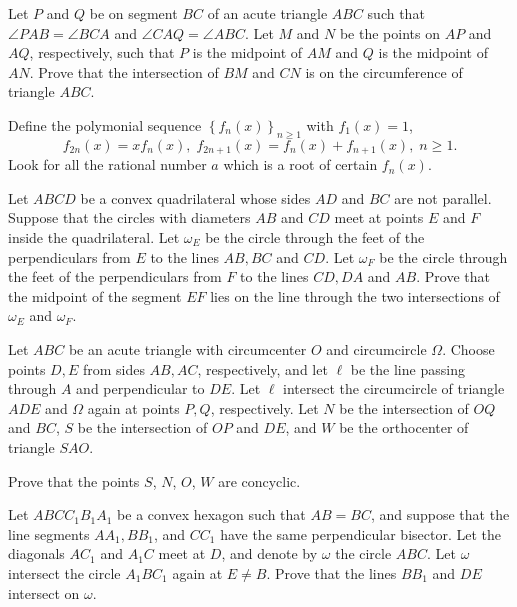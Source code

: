 \documentclass[11pt]{scrartcl}
\begin{document}
\begin{problem}[5026826170538858627]
Let $P$ and $Q$ be on segment $BC$ of an acute triangle $ABC$ such that $\angle PAB=\angle BCA$ and $\angle CAQ=\angle ABC$. Let $M$ and $N$ be the points on $AP$ and $AQ$, respectively, such that $P$ is the midpoint of $AM$ and $Q$ is the midpoint of $AN$. Prove that the intersection of $BM$ and $CN$ is on the circumference of triangle $ABC$.
\end{problem}
\begin{problem}[5041525965152542097]
Define the polymonial sequence $\left \{ f_n\left ( x \right ) \right \}_{n\ge 1}$ with $f_1\left ( x \right )=1$,$$f_{2n}\left ( x \right )=xf_n\left ( x \right ), \; f_{2n+1}\left ( x \right ) = f_n\left ( x \right )+ f_{n+1} \left ( x \right ), \; n\ge 1.$$Look for all the rational number $a$ which is a root of certain $f_n\left ( x \right ).$
\end{problem}
\begin{problem}[5062971667185317512]
	Let $ABCD$ be a convex quadrilateral whose sides $AD$ and $BC$ are not parallel. Suppose that the circles with diameters $AB$ and $CD$ meet at points $E$ and $F$ inside the quadrilateral. Let $\omega_E$ be the circle through the feet of the perpendiculars from $E$ to the lines $AB,BC$ and $CD$. Let $\omega_F$ be the circle through the feet of the perpendiculars from $F$ to the lines $CD,DA$ and $AB$. Prove that the midpoint of the segment $EF$ lies on the line through the two intersections of $\omega_E$ and $\omega_F$.
\end{problem}
\begin{problem}[5066939379306191291]
Let $ABC$ be an acute triangle with circumcenter $O$ and circumcircle $\Omega$. Choose points $D, E$ from sides $AB, AC$, respectively, and let $\ell$ be the line passing through $A$ and perpendicular to $DE$. Let $\ell$ intersect the circumcircle of triangle $ADE$ and $\Omega$ again at points $P, Q$, respectively. Let $N$ be the intersection of $OQ$ and $BC$, $S$ be the intersection of $OP$ and $DE$, and $W$ be the orthocenter of triangle $SAO$.

Prove that the points $S$, $N$, $O$, $W$ are concyclic.
\end{problem}
\begin{problem}[5073004669687570949]
	Let $ABCC_1B_1A_1$ be a convex hexagon such that $AB=BC$, and suppose that the line segments $AA_1, BB_1$, and $CC_1$ have the same perpendicular bisector. Let the diagonals $AC_1$ and $A_1C$ meet at $D$, and denote by $\omega$ the circle $ABC$. Let $\omega$ intersect the circle $A_1BC_1$ again at $E \neq B$. Prove that the lines $BB_1$ and $DE$ intersect on $\omega$.
\end{problem}
\end{document}
